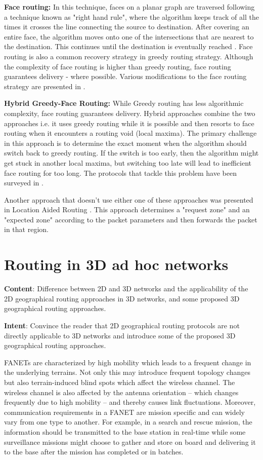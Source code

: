 \textbf{Face routing:} In this technique, faces on a planar graph are traversed following a technique known as "right hand rule", where the algorithm keeps track of all the times it crosses the line connecting the source to destination. After covering an entire face, the algorithm moves onto one of the intersections that are nearest to the destination. This continues until the destination is eventually reached \cite{4448977} \cite{6238283}. Face routing is also a common recovery strategy in greedy routing strategy. Although the complexity of face routing is higher than greedy routing, face routing guarantees delivery - where possible. Various modifications to the face routing strategy are presented in \cite{6238283}.

\textbf{Hybrid Greedy-Face Routing:} While Greedy routing has less algorithmic complexity, face routing guarantees delivery. Hybrid approaches combine the two approaches i.e. it uses greedy routing while it is possible and then resorts to face routing when it encounters a routing void (local maxima). The primary challenge in this approach is to determine the exact moment when the algorithm should switch back to greedy routing. If the switch is too early, then the algorithm might get stuck in another local maxima, but switching too late will lead to inefficient face routing for too long. The protocols that tackle this problem have been surveyed in \cite{6238283}.

Another approach that doesn't use either one of these approaches was presented in Location Aided Routing \cite{Ko:1998:LRM:288235.288252}. This approach determines a "request zone" and an "expected zone" according to the packet parameters and then forwards the packet in that region.

\section{Routing in 3D ad hoc networks}

\textbf{Content}: Difference between 2D and 3D networks and the applicability of the 2D geographical routing approaches in 3D networks, and some proposed 3D geographical routing approaches.
 
\textbf{Intent}: Convince the reader that 2D geographical routing protocols are not directly applicable to 3D networks and introduce some of the proposed 3D geographical routing approaches.

FANETs are characterized by high mobility which leads to a frequent change in the underlying terrains. Not only this may introduce frequent topology changes but also terrain-induced blind spots which affect the wireless channel. The wireless channel is also affected by the antenna orientation – which changes frequently due to high mobility – and thereby causes link fluctuations. Moreover, communication requirements in a FANET are mission specific and can widely vary from one type to another. For example, in a search and rescue mission, the information should be transmitted to the base station in real-time while some surveillance missions might choose to gather and store on board and delivering it to the base after the mission has completed or in batches.

